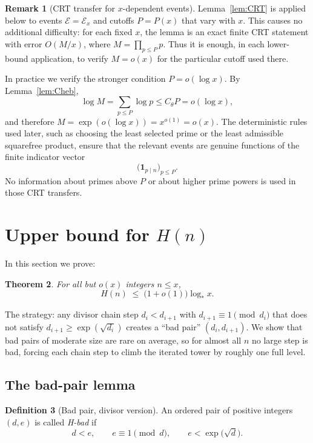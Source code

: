 \documentclass[11pt,reqno]{amsart}
\theoremstyle{plain}
\newtheorem{theorem}{Theorem}[section]
\theoremstyle{definition}
\newtheorem{definition}[theorem]{Definition}
\newtheorem{remark}[theorem]{Remark}
\newcommand{\logstar}{\log_{\!*}}
\begin{document}
\begin{remark}[CRT transfer for $x$-dependent events]\label{rem:CRT-x-dependent}
Lemma~\ref{lem:CRT} is applied below to events $\mathcal E=\mathcal E_x$ and
cutoffs $P=P(x)$ that vary with $x$. This causes no additional difficulty:
for each fixed $x$, the lemma is an exact finite CRT statement with error
$O(M/x)$, where $M=\prod_{p\le P}p$. Thus it is enough, in each lower-bound
application, to verify $M=o(x)$ for the particular cutoff used there.

In practice we verify the stronger condition $P=o(\log x)$. By
Lemma~\ref{lem:Cheb},
\[
\log M=\sum_{p\le P}\log p\le C_\theta P=o(\log x),
\]
and therefore $M=\exp(o(\log x))=x^{o(1)}=o(x)$. The deterministic rules used
later, such as choosing the least selected prime or the least admissible
squarefree product, ensure that the relevant events are genuine functions of
the finite indicator vector
\[
\bigl(\mathbf 1_{p\mid n}\bigr)_{p\le P}.
\]
No information about primes above $P$ or about higher prime powers is used in
those CRT transfers.
\end{remark}

\section{Upper bound for $H(n)$}\label{sec:upper-H}

In this section we prove:

\begin{theorem}\label{thm:upper-H}
For all but $o(x)$ integers $n\le x$,
\begin{equation}\label{eq:thm-upper-H}
H(n) \;\le\; \bigl(1 + o(1)\bigr)\logstar x.
\end{equation}
\end{theorem}

The strategy: any divisor chain step $d_i<d_{i+1}$ with $d_{i+1}\equiv 1\pmod{d_i}$ that does not satisfy $d_{i+1}\ge \exp(\sqrt{d_i})$ creates a ``bad pair''
$(d_i,d_{i+1})$. We show that bad pairs of moderate size are rare on average,
so for almost all $n$ no large step is bad, forcing each chain step to climb
the iterated tower by roughly one full level.

\subsection{The bad-pair lemma}

\begin{definition}[Bad pair, divisor version]\label{def:bad-pair-H}
An ordered pair of positive integers $(d,e)$ is called
\emph{H-bad} if
\begin{equation}\label{eq:bad-pair-def-H}
d<e, \qquad e\equiv 1 \pmod{d}, \qquad e<\exp\bigl(\sqrt{d}\bigr).
\end{equation}
\end{definition}
\end{document}

